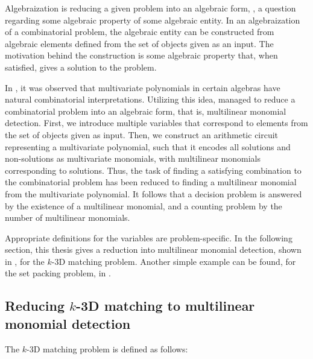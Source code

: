 Algebraization is reducing a given problem into an algebraic form,
, a
question regarding some algebraic property of some algebraic entity. 
In an algebraization of a combinatorial problem, the algebraic entity can be constructed from algebraic elements defined from the 
set of objects given as an input. The motivation behind the construction is some algebraic property that, 
when satisfied, gives a solution to the problem.

In \cite{Valiant92}, it was observed that multivariate polynomials in certain algebras have natural combinatorial interpretations. 
Utilizing this idea, \cite{Koutis05} managed to reduce a combinatorial problem
into an algebraic form, that is, multilinear monomial detection. 
First, we introduce multiple variables that 
correspond to elements from the set of objects given as input. 
Then, we construct an arithmetic circuit representing a multivariate polynomial, such that it 
encodes all solutions and non-solutions as multivariate monomials, 
with multilinear monomials corresponding to solutions. 
Thus, the task of finding a satisfying combination to the combinatorial problem has been reduced to 
finding a multilinear monomial from the multivariate polynomial.
It follows that a decision problem is answered by 
the existence of a multilinear monomial, and a counting problem by the number of multilinear monomials.

Appropriate definitions for the variables are problem-specific. In the following section, this thesis gives a 
reduction into multilinear monomial detection, shown in \cite{KouWil15}, 
for the $k$-3D matching problem. Another simple example can be found, for the set packing problem, in \cite{Koutis05}.


\subsection{Reducing $k$-3D matching to multilinear monomial detection}
\label{sect:reduction_example}

The $k$-3D matching problem is defined as follows:

\begin{problem}
\end{problem}

